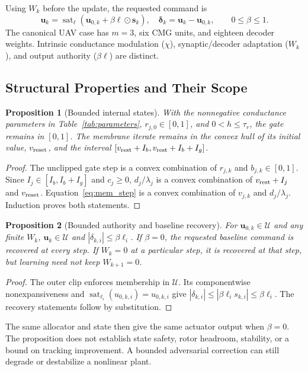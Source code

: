\documentclass[letterpaper,10pt,conference]{IEEEtran}
\newcommand{\sat}{\operatorname{sat}}
\newtheorem{proposition}{Proposition}
\begin{document}
Using $W_k$ before the update, the requested command is
\begin{equation}
 \bm u_k=\sat_{\bm\ell}(\bm u_{0,k}+\beta\bm\ell\odot\bm s_k),\quad
 \bm\delta_k=\bm u_k-\bm u_{0,k},\qquad 0\le\beta\le1.
 \label{eq:residual}
\end{equation}
The canonical UAV case has $m=3$, six CMG units, and eighteen decoder
weights. Intrinsic conductance modulation ($\chi$), synaptic/decoder
adaptation ($W_k$), and output authority ($\beta\bm\ell$) are distinct.

\subsection{Structural Properties and Their Scope}
\begin{proposition}[Bounded internal states]
With the nonnegative conductance parameters in Table~\ref{tab:parameters},
$r_{j,0}\in[0,1]$, and $0<h\le\tau_r$, the gate remains in $[0,1]$.
The membrane iterate remains in the convex hull of its initial value,
$v_{\rm reset}$, and the interval
$[v_{\rm rest}+I_b,v_{\rm rest}+I_b+I_g]$.
\end{proposition}
\begin{proof}
The unclipped gate step is a convex combination of $r_{j,k}$ and
$b_{j,k}\in[0,1]$. Since $I_j\in[I_b,I_b+I_g]$ and $c_j\ge0$,
$d_j/\lambda_j$ is a convex combination of $v_{\rm rest}+I_j$ and
$v_{\rm reset}$. Equation~\eqref{eq:mem_step} is a convex combination of
$v_{j,k}$ and $d_j/\lambda_j$. Induction proves both statements.
\end{proof}

\begin{proposition}[Bounded authority and baseline recovery]
\label{prop:authority}
For $\bm u_{0,k}\in\mathcal U$ and any finite $W_k$,
$\bm u_k\in\mathcal U$ and $|\delta_{k,i}|\le\beta\ell_i$.
If $\beta=0$, the requested baseline command is recovered at every step.
If $W_k=0$ at a particular step, it is recovered at that step, but learning
need not keep $W_{k+1}=0$.
\end{proposition}
\begin{proof}
The outer clip enforces membership in $\mathcal U$. Its componentwise
nonexpansiveness and $\sat_{\ell_i}(u_{0,k,i})=u_{0,k,i}$ give
$|\delta_{k,i}|\le|\beta\ell_i s_{k,i}|\le\beta\ell_i$.
The recovery statements follow by substitution.
\end{proof}
The same allocator and state then give the same actuator output when
$\beta=0$. The proposition does not establish state safety, rotor
headroom, stability, or a bound on tracking improvement. A bounded
adversarial correction can still degrade or destabilize a nonlinear plant.
\end{document}
